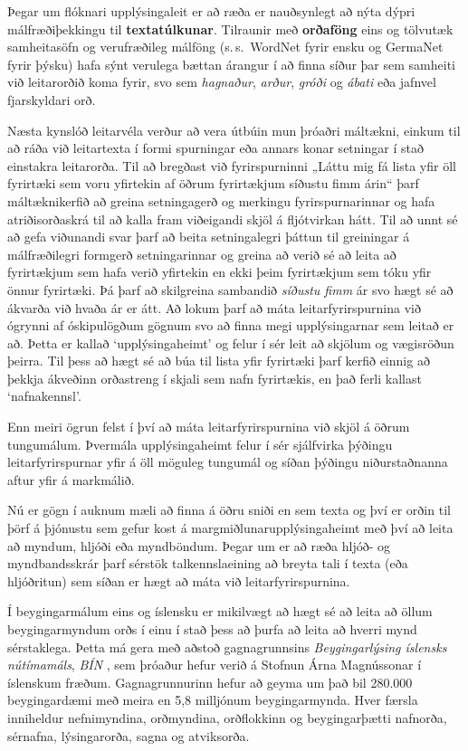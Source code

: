 \documentclass{../../metanetpaper}
\begin{document}
\begin{multicols}{2}
Þegar um flóknari upplýsingaleit er að ræða er nauðsynlegt að nýta dýpri málfræðiþekkingu til \textbf{textatúlkunar}. Tilraunir með \textbf{orðaföng} eins og tölvutæk samheitasöfn og verufræðileg málföng (s.\,s.~WordNet fyrir ensku og GermaNet fyrir þýsku) hafa sýnt verulega bættan árangur í að finna síður þar sem samheiti við leitarorðið koma fyrir, svo sem  \textit{hagnaður}, \textit{arður}, \textit{gróði} og  \textit{ábati} eða jafnvel fjarskyldari orð.

Næsta kynslóð leitarvéla verður að vera útbúin mun þróaðri máltækni, einkum til að ráða við leitartexta í formi spurningar eða annars konar setningar í stað einstakra leitarorða. Til að bregðast við fyrirspurninni „Láttu mig fá lista yfir öll fyrirtæki sem voru yfirtekin af öðrum fyrirtækjum síðustu fimm árin“ þarf máltæknikerfið að greina setningagerð og merkingu fyrirspurnarinnar og hafa atriðisorðaskrá til að kalla fram viðeigandi skjöl á fljótvirkan hátt. Til að unnt sé að gefa viðunandi svar þarf að beita setningalegri þáttun til greiningar á málfræðilegri formgerð setningarinnar og greina að verið sé að leita að fyrirtækjum sem hafa verið yfirtekin en ekki þeim fyrirtækjum sem tóku yfir önnur fyrirtæki. Þá þarf að skilgreina sambandið  \textit{síðustu fimm} ár svo hægt sé að ákvarða við hvaða ár er átt. Að lokum þarf að máta leitarfyrirspurnina við ógrynni af óskipulögðum gögnum svo að finna megi upplýsingarnar sem leitað er að. Þetta er kallað ‘upplýsingaheimt’ og felur í sér leit að skjölum og vægisröðun þeirra. Til þess að hægt sé að búa til lista yfir fyrirtæki þarf kerfið einnig að þekkja ákveðinn orðastreng í skjali sem nafn fyrirtækis, en það ferli kallast ‘nafnakennsl’. 


Enn meiri ögrun felst í því að máta leitarfyrirspurnina við skjöl á öðrum tungumálum. Þvermála upplýsingaheimt felur í sér sjálfvirka þýðingu leitarfyrirspurnar yfir á öll möguleg tungumál og síðan þýðingu niðurstaðnanna aftur yfir á markmálið.

Nú er gögn í auknum mæli að finna á öðru sniði en sem texta og því er orðin til þörf á þjónustu sem gefur kost á margmiðlunarupplýsingaheimt með því að leita að myndum, hljóði eða myndböndum. Þegar um er að ræða hljóð- og myndbandsskrár þarf sérstök talkennslaeining að breyta tali í texta (eða hljóðritun) sem síðan er hægt að máta við leitarfyrirspurnina.

Í beygingarmálum eins og íslensku er mikilvægt að hægt sé að leita að öllum beygingarmyndum orðs í einu í stað þess að þurfa að leita að hverri mynd sérstaklega. Þetta má gera með aðstoð gagnagrunnsins \textit{Beygingarlýsing íslensks nútímamáls}, \textit{BÍN} \cite{bin1}, sem þróaður hefur verið á Stofnun Árna Magnússonar í íslenskum fræðum. Gagnagrunnurinn hefur að geyma um það bil 280.000 beygingardæmi með meira en 5,8 milljónum beygingarmynda. Hver færsla inniheldur nefnimyndina, orðmyndina, orðflokkinn og beygingarþætti nafnorða, sérnafna, lýsingarorða, sagna og atviksorða.


\end{multicols}
\end{document}

